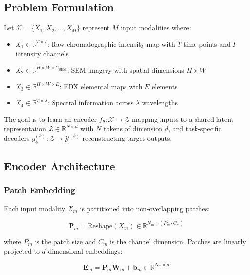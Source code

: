 \documentclass[12pt,a4paper]{article}
\begin{document}
\subsection{Problem Formulation}

Let $\mathcal{X} = \{X_1, X_2, \ldots, X_M\}$ represent $M$ input modalities where:

\begin{itemize}
    \item $X_1 \in \mathbb{R}^{T \times I}$: Raw chromatographic intensity map with $T$ time points and $I$ intensity channels
    \item $X_2 \in \mathbb{R}^{H \times W \times C_{\text{SEM}}}$: SEM imagery with spatial dimensions $H \times W$
    \item $X_3 \in \mathbb{R}^{H \times W \times E}$: EDX elemental maps with $E$ elements
    \item $X_4 \in \mathbb{R}^{T \times \lambda}$: Spectral information across $\lambda$ wavelengths
\end{itemize}

The goal is to learn an encoder $f_\theta: \mathcal{X} \rightarrow \mathcal{Z}$ mapping inputs to a shared latent representation $\mathcal{Z} \in \mathbb{R}^{N \times d}$ with $N$ tokens of dimension $d$, and task-specific decoders $g_\phi^{(k)}: \mathcal{Z} \rightarrow \mathcal{Y}^{(k)}$ reconstructing target outputs.

\subsection{Encoder Architecture}

\subsubsection{Patch Embedding}

Each input modality $X_m$ is partitioned into non-overlapping patches:

\begin{equation}
\mathbf{P}_m = \text{Reshape}(X_m) \in \mathbb{R}^{N_m \times (P_m^2 \cdot C_m)}
\end{equation}

where $P_m$ is the patch size and $C_m$ is the channel dimension. Patches are linearly projected to $d$-dimensional embeddings:

\begin{equation}
\mathbf{E}_m = \mathbf{P}_m \mathbf{W}_m + \mathbf{b}_m \in \mathbb{R}^{N_m \times d}
\end{equation}
\end{document}
